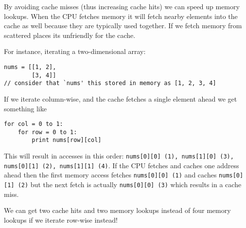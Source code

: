 By avoiding cache misses (thus increasing cache hits) we can speed up memory lookups. When the CPU fetches memory it will fetch nearby elements into the cache as well because they are typically used together. If we fetch memory from scattered places its unfriendly for the cache.

For instance, iterating a two-dimensional array:

\begin{lstlisting}
nums = [[1, 2],
        [3, 4]]
// consider that `nums' this stored in memory as [1, 2, 3, 4]
\end{lstlisting}

If we iterate column-wise, and the cache fetches a single element ahead we get something like

\begin{lstlisting}
for col = 0 to 1:
    for row = 0 to 1:
        print nums[row][col]
\end{lstlisting}

This will result in accesses in this order: \texttt{nums[0][0] (1), nums[1][0] (3), nums[0][1] (2), nums[1][1] (4)}. If the CPU fetches and caches one address ahead then the first memory access fetches \texttt{nums[0][0] (1)} and caches \texttt{nums[0][1] (2)} but the next fetch is actually \texttt{nums[0][0] (3)} which results in a cache miss.

We can get two cache hits and two memory lookups instead of four memory lookups if we iterate row-wise instead!

